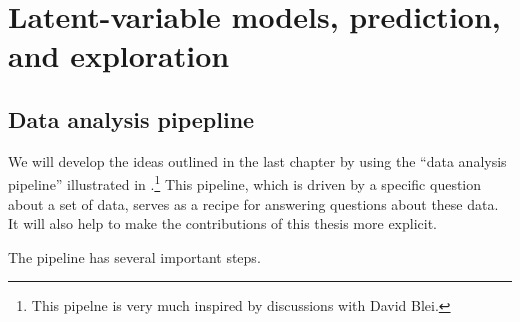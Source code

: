 \label{sec:pipeline}

\section{Latent-variable models, prediction, and exploration}

\subsection{Data analysis pipepline}
\label{sec:data_analysis_pipeline}
We will develop the ideas outlined in the last chapter by using the
``data analysis pipeline'' illustrated in
.\footnote{This pipelne is very much
  inspired by discussions with David Blei.}  This pipeline, which
is driven by a specific question about a set of data, serves as a
recipe for answering questions about these data.  It will also help to
make the contributions of this thesis more explicit.

The pipeline has several important steps.

